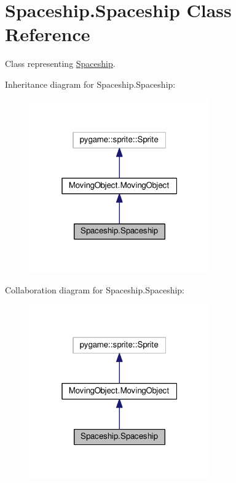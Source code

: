 \hypertarget{classSpaceship_1_1Spaceship}{}\section{Spaceship.\+Spaceship Class Reference}
\label{classSpaceship_1_1Spaceship}


Class representing \hyperlink{classSpaceship_1_1Spaceship}{Spaceship}.  




Inheritance diagram for Spaceship.\+Spaceship\+:\nopagebreak
\begin{figure}[H]
\begin{center}
\leavevmode
\includegraphics[width=220pt]{classSpaceship_1_1Spaceship__inherit__graph}
\end{center}
\end{figure}


Collaboration diagram for Spaceship.\+Spaceship\+:\nopagebreak
\begin{figure}[H]
\begin{center}
\leavevmode
\includegraphics[width=220pt]{classSpaceship_1_1Spaceship__coll__graph}
\end{center}
\end{figure}
